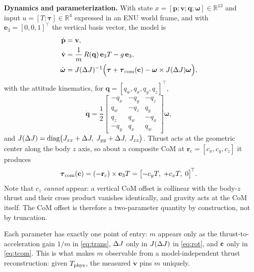 \documentclass[conference]{IEEEtran}
\begin{document}
\textbf{Dynamics and parameterization.} With state
$x = [\mathbf{p}; \mathbf{v}; \mathbf{q}; \boldsymbol{\omega}] \in \mathbb{R}^{13}$ and input
$u = [T; \boldsymbol{\tau}] \in \mathbb{R}^{4}$ expressed in an ENU world frame, and with
$\mathbf{e}_3 = [0, 0, 1]^{\!\top}$ the vertical basis vector, the model is
\begin{align}
\dot{\mathbf{p}} &= \mathbf{v}, \label{eq:kin}\\
\dot{\mathbf{v}} &= \frac{1}{m}\, R(\mathbf{q})\,\mathbf{e}_3 T - g\,\mathbf{e}_3, \label{eq:trans}\\
\dot{\boldsymbol{\omega}} &= J(\Delta J)^{-1}\Bigl( \boldsymbol{\tau} + \boldsymbol{\tau}_{\mathrm{com}}(\mathbf{c}) - \boldsymbol{\omega} \times J(\Delta J)\boldsymbol{\omega} \Bigr), \label{eq:rot}
\end{align}
with the attitude kinematics, for $\mathbf{q} = [q_w, q_x, q_y, q_z]^{\!\top}$,
\begin{equation}
\dot{\mathbf{q}} = \frac{1}{2}
\begin{bmatrix}
-q_x & -q_y & -q_z \\
 q_w & -q_z &  q_y \\
 q_z &  q_w & -q_x \\
-q_y &  q_x &  q_w
\end{bmatrix} \boldsymbol{\omega},
\label{eq:quat}
\end{equation}
and $J(\Delta J) = \mathrm{diag}\bigl(J_{xx} + \Delta J,\; J_{yy} + \Delta J,\; J_{zz}\bigr)$. Thrust acts at
the geometric center along the body $z$ axis, so about a composite CoM at
$\mathbf{r}_c = [c_x, c_y, c_z]$ it produces
\begin{equation}
\boldsymbol{\tau}_{\mathrm{com}}(\mathbf{c}) = (-\mathbf{r}_c) \times \mathbf{e}_3 T = \bigl[-c_y T,\; +c_x T,\; 0\bigr]^{\!\top}. \label{eq:tcom}
\end{equation}
Note that $c_z$ \emph{cannot} appear: a vertical CoM offset is collinear with the body-$z$
thrust and their cross product vanishes identically, and gravity acts at the CoM itself. The
CoM offset is therefore a two-parameter quantity by construction, not by truncation.

Each parameter has exactly one point of entry: $m$ appears only as the thrust-to-acceleration
gain $1/m$ in \eqref{eq:trans}, $\Delta J$ only in $J(\Delta J)$ in \eqref{eq:rot}, and $\mathbf{c}$ only in
\eqref{eq:tcom}. This is what makes $m$ observable from a model-independent thrust
reconstruction: given $T_{\mathrm{phys}}$, the measured $\dot{\mathbf{v}}$ pins $m$ uniquely.
\end{document}
